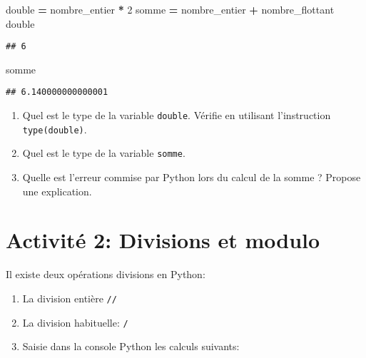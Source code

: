 \documentclass[
]{book}
\newenvironment{Shaded}{\begin{snugshade}}{\end{snugshade}}
\newcommand{\DecValTok}[1]{\textcolor[rgb]{0.00,0.00,0.81}{#1}}
\newcommand{\NormalTok}[1]{#1}
\newcommand{\OperatorTok}[1]{\textcolor[rgb]{0.81,0.36,0.00}{\textbf{#1}}}
\providecommand{\tightlist}{%
  \setlength{\itemsep}{0pt}\setlength{\parskip}{0pt}}
\def\tightlist{}
\begin{document}
\begin{Shaded}
\begin{Highlighting}[]
\NormalTok{double }\OperatorTok{=}\NormalTok{ nombre\_entier }\OperatorTok{*} \DecValTok{2}
\NormalTok{somme }\OperatorTok{=}\NormalTok{ nombre\_entier }\OperatorTok{+}\NormalTok{ nombre\_flottant}
\NormalTok{double}
\end{Highlighting}
\end{Shaded}

\begin{verbatim}
## 6
\end{verbatim}

\begin{Shaded}
\begin{Highlighting}[]
\NormalTok{somme}
\end{Highlighting}
\end{Shaded}

\begin{verbatim}
## 6.140000000000001
\end{verbatim}

\begin{enumerate}
\def\labelenumi{\arabic{enumi}.}
\tightlist
\item
  Quel est le type de la variable \texttt{double}. Vérifie en utilisant l'instruction \texttt{type(double)}.
\item
  Quel est le type de la variable \texttt{somme}.
\item
  Quelle est l'erreur commise par Python lors du calcul de la somme ? Propose une explication.
\end{enumerate}

\newpage

\hypertarget{activituxe9-2-divisions-et-modulo}{%
\section{Activité 2: Divisions et modulo}\label{activituxe9-2-divisions-et-modulo}}

Il existe deux opérations divisions en Python:

\begin{enumerate}
\def\labelenumi{\arabic{enumi}.}
\item
  La division entière \texttt{//}
\item
  La division habituelle: \texttt{/}
\item
  Saisie dans la console Python les calculs suivants:
\end{enumerate}
\end{document}
